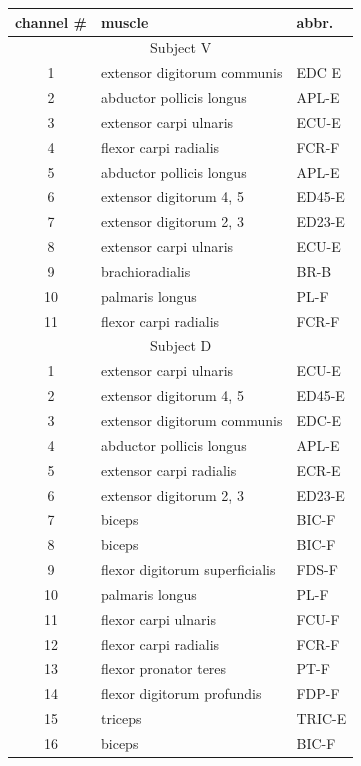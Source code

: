 \begin{table}[ht]
 	\centering
	\small
 	\begin{tabular}{cll}
		\toprule
			channel \# & muscle & abbr. \\
			\toprule
			\multicolumn{3}{c}{Subject V} \\
			1  &	extensor digitorum communis &	EDC E\\
			2  &  	abductor pollicis longus 	&	APL-E\\
			3  &	extensor carpi ulnaris 		&	ECU-E\\
			4  &	flexor carpi radialis 		&	FCR-F\\
			5  &	abductor pollicis longus 	&	APL-E\\
			6  &	extensor digitorum 4, 5 	&	ED45-E\\
			7  &	extensor digitorum 2, 3 	&	ED23-E\\
			8  &	extensor carpi ulnaris 		&	ECU-E\\
			9  &	brachioradialis 			&	BR-B\\
			10 & 	palmaris longus 			&	PL-F\\
			11 & 	flexor carpi radialis 		&	FCR-F\\
			
			\midrule
			\multicolumn{3}{c}{Subject D}  \\
			1  &	extensor carpi ulnaris          &	ECU-E\\
			2  &  	extensor digitorum 4, 5	        &	ED45-E\\
			3  &	extensor digitorum communis     &	EDC-E\\
			4  &	abductor pollicis longus 	    &	APL-E\\
			5  &	extensor carpi radialis 	    &	ECR-E\\
			6  &	extensor digitorum 2, 3         &	ED23-E\\
			7  &	biceps	                        &	BIC-F\\
			8  &	biceps 		                    &	BIC-F\\
			9  &	flexor digitorum superficialis 	&	FDS-F\\
			10 & 	palmaris longus 		        &	PL-F\\ 
			11 & 	flexor carpi ulnaris 		    &	FCU-F\\
			12 &	flexor carpi radialis 		    &	FCR-F\\
			13 & 	flexor pronator teres		    &	PT-F\\
			14 & 	flexor digitorum profundis 	    &	FDP-F\\
			15 &	triceps 			            &	TRIC-E\\
			16 & 	biceps 			                &	BIC-F\\


\end{tabular}
\end{table}
